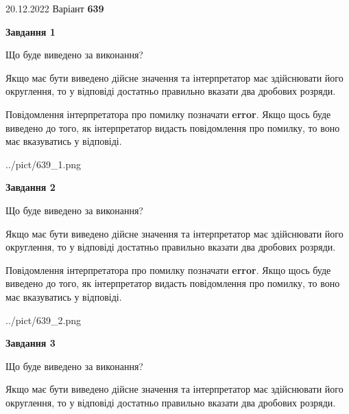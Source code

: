\documentclass[12pt, ukrainian]{article}
\begin{document}
{20.12.2022 Варіант \No \textbf { 639 }\par}
{
\begin {Large}

{\begin {center}\textbf{Завдання 1}\end {center}}\par
Що буде виведено за виконання? \par

Якщо має бути виведено дійсне значення та інтерпретатор має здійснювати його округлення, 
то у відповіді достатньо правильно вказати два дробових розряди.

Повідомлення інтерпретатора про помилку позначати \textbf{error}.
Якщо щось буде виведено до того, як інтерпретатор видасть повідомлення про помилку, 
то воно має вказуватись у відповіді. \par

\begin{center}
	{../pict/639_1.png}
\end{center}
\newpage

{\begin {center}\textbf{Завдання 2}\end {center}}\par
Що буде виведено за виконання? \par

Якщо має бути виведено дійсне значення та інтерпретатор має здійснювати його округлення, 
то у відповіді достатньо правильно вказати два дробових розряди.

Повідомлення інтерпретатора про помилку позначати \textbf{error}.
Якщо щось буде виведено до того, як інтерпретатор видасть повідомлення про помилку, 
то воно має вказуватись у відповіді. \par

\begin{center}
	{../pict/639_2.png}
\end{center}
\newpage

{\begin {center}\textbf{Завдання 3}\end {center}}\par
Що буде виведено за виконання? \par

Якщо має бути виведено дійсне значення та інтерпретатор має здійснювати його округлення, 
то у відповіді достатньо правильно вказати два дробових розряди.


\end{Large}}
\end{document}

